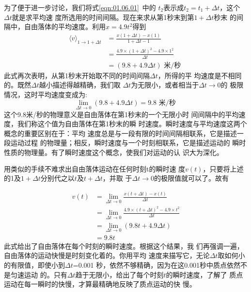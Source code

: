 为了便于进一步讨论，我们将式\ref{eqn:01.06.01}~中的
$t_2$表示成$t_2=t_1+\Delta t$，这个$\Delta t$就是求平均速
度所选用的时间间隔。现在来求从第1秒末到第$1+\Delta t$秒末
的间隔中，自由落体的平均速度。利用$x=4.9t^2$得到
\begin{equation*}
  \begin{aligned}
    \langle v\rangle_{1 \rightarrow 1+\Delta t} & =\frac{x\left(1+\Delta t\right)-x\left(1\right)}{1+\Delta t-1}           \\
                                                & =\frac{4.9 \times\left(1+\Delta t\right)^{2}-4.9 \times 1^{2}}{\Delta t} \\
                                                & =\left(9.8+4.9 \Delta t\right) \text { 米/秒 }
  \end{aligned}
\end{equation*}
此式再次表明，从第1秒末开始取不同的时间间隔$\Delta t$，所得的平
均速度是不相同的。既然$\Delta t$越小描述得越精确，我们取
$\Delta t$为无限小，或者相当于$\Delta t \rightarrow 0$的
极限情况，这时平均速度变成为:
\begin{equation*}
  \lim _{\Delta t \rightarrow 0}\left(9.8+4.9 \Delta t\right)=9.8 \text { 米/秒 }
\end{equation*}
这个9.8米/秒的物理意义是自由落体在第1秒末的一个无限小时
间间隔中的平均速度，我们称这个值为自由落体在第1秒末的瞬
时速度。瞬时速度与平均速度这两个概念的重要区别在于：平均
速度总是与一段有限的时间间隔相联系，它是描述一段运动过程
的物理量；相反，瞬时速度与一个时刻相联系，它是描述运动的
瞬时性质的物理量。有了瞬时速度这个概念，使我们对运动的认
识大为深化。

用类似的手续不难求出自由落体运动在任何时刻t的瞬时速
度$v\left(t\right)$，只要将上述的1及$1+\Delta t$分别代之以$t$及$t+\Delta t$，并取
于$\Delta t \rightarrow 0$的极限值就可以了。故有

\begin{equation}\label{eqn:01.06.02}
  \begin{aligned}
    v\left(t\right) & =\lim _{\Delta t \rightarrow 0} \frac{x\left(t+\Delta t\right)-x\left(t\right)}{\Delta t}               \\
                    & =\lim _{\Delta t \rightarrow 0} \frac{4.9 \times\left(t+\Delta t\right)^{2}-4.9 \times t^{2}}{\Delta t} \\
                    & =\lim _{\Delta t \rightarrow 0}\left(9.8 t+4.9 \Delta t\right)                                          \\
                    & =9.8 t
  \end{aligned}
\end{equation}
此式给出了自由落体在每个时刻的瞬时速度。根据这个结果，我
们再强调一遍，自由落体的运动快慢是时刻变化着的。你用平均
速度来描写它，无论$\Delta t$取如何小的有限值，即使小到$\Delta t$=0.001
秒，依然不够精确，因为在这0.001秒中质点依然不是匀速运动
的。只有$\Delta t$趋于无限小，给出了每个时刻$t$的瞬时速度，了解了
质点运动在每一瞬时的快慢，才算最精确地反映了质点运动的快
慢。

